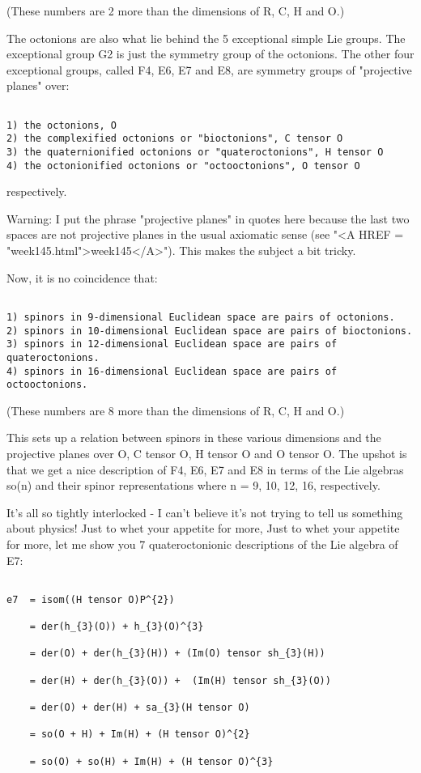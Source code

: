 (These numbers are 2 more than the dimensions of R, C, H and O.)

The octonions are also what lie behind the 5 exceptional simple Lie
groups.  The exceptional group G2 is just the symmetry group of the
octonions.  The other four exceptional groups, called F4, E6, E7
and E8, are symmetry groups of "projective planes" over:


\begin{verbatim}

1) the octonions, O
2) the complexified octonions or "bioctonions", C tensor O
3) the quaternionified octonions or "quateroctonions", H tensor O
4) the octonionified octonions or "octooctonions", O tensor O
\end{verbatim}
    
respectively.

Warning: I put the phrase "projective planes" in quotes here
because the last two spaces are not projective planes in the usual
axiomatic sense (see "<A HREF = "week145.html">week145</A>").
This makes the subject a bit tricky.

Now, it is no coincidence that:


\begin{verbatim}

1) spinors in 9-dimensional Euclidean space are pairs of octonions.
2) spinors in 10-dimensional Euclidean space are pairs of bioctonions.
3) spinors in 12-dimensional Euclidean space are pairs of quateroctonions.
4) spinors in 16-dimensional Euclidean space are pairs of octooctonions.
\end{verbatim}
    
(These numbers are 8 more than the dimensions of R, C, H and O.)

This sets up a relation between spinors in these various dimensions
and the projective planes over O, C tensor O, H tensor O and O tensor O.
The upshot is that we get a nice description of F4, E6, E7 and E8 in
terms of the Lie algebras so(n) and their spinor representations where
n = 9, 10, 12, 16, respectively.

It's all so tightly interlocked - I can't believe it's not trying to
tell us something about physics!  Just to whet your appetite for more,
Just to whet your appetite for more, let
me show you 7 quateroctonionic descriptions of the Lie algebra of E7:


\begin{verbatim}

e7  = isom((H tensor O)P^{2})    

    = der(h_{3}(O)) + h_{3}(O)^{3}  

    = der(O) + der(h_{3}(H)) + (Im(O) tensor sh_{3}(H)) 

    = der(H) + der(h_{3}(O)) +  (Im(H) tensor sh_{3}(O)) 

    = der(O) + der(H) + sa_{3}(H tensor O) 

    = so(O + H) + Im(H) + (H tensor O)^{2} 

    = so(O) + so(H) + Im(H) + (H tensor O)^{3}  
\end{verbatim}
    

